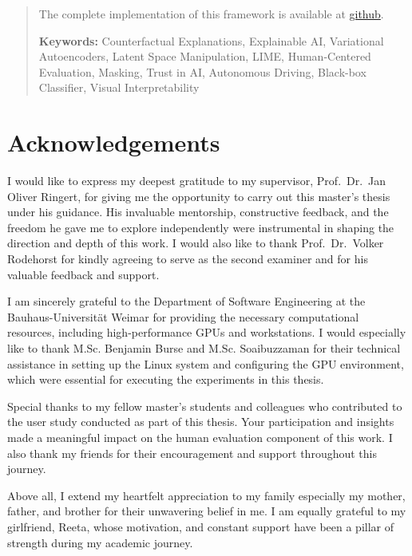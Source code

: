 \begin{abstract}
The complete implementation of this framework is available at \href{https://github.com/darshandodamani/A-Counterfactual-Explanation-Approach-Using-Deep-Generative-Models} {github}.

\textbf{Keywords:}
Counterfactual Explanations, Explainable AI, Variational Autoencoders, Latent Space Manipulation, LIME, Human-Centered Evaluation, Masking, Trust in AI, Autonomous Driving, Black-box Classifier, Visual Interpretability
\end{abstract}

\clearpage
\thispagestyle{empty}
\null
\clearpage

\chapter*{Acknowledgements}

I would like to express my deepest gratitude to my supervisor, Prof.\ Dr.\ Jan Oliver Ringert, for giving me the opportunity to carry out this master's thesis under his guidance. His invaluable mentorship, constructive feedback, and the freedom he gave me to explore independently were instrumental in shaping the direction and depth of this work. I would also like to thank Prof.\ Dr.\ Volker Rodehorst for kindly agreeing to serve as the second examiner and for his valuable feedback and support.

I am sincerely grateful to the Department of Software Engineering at the Bauhaus-Universität Weimar for providing the necessary computational resources, including high-performance GPUs and workstations. I would especially like to thank M.Sc. Benjamin Burse and M.Sc. Soaibuzzaman for their technical assistance in setting up the Linux system and configuring the GPU environment, which were essential for executing the experiments in this thesis.

Special thanks to my fellow master's students and colleagues who contributed to the user study conducted as part of this thesis. Your participation and insights made a meaningful impact on the human evaluation component of this work. I also thank my friends for their encouragement and support throughout this journey.

Above all, I extend my heartfelt appreciation to my family especially my mother, father, and brother for their unwavering belief in me. I am equally grateful to my girlfriend, Reeta, whose motivation, and constant support have been a pillar of strength during my academic journey.

